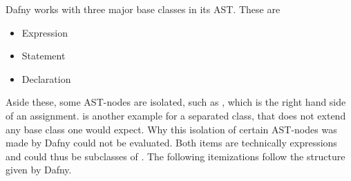 Dafny works with three major base classes in its AST.
These are
\begin{itemize}
    \item Expression
    \item Statement
    \item Declaration
\end{itemize}
Aside these, some AST-nodes are isolated, such as , which is the right hand side of an assignment.
 is another example for a separated class, that does not extend any base class one would expect.
Why this isolation of certain AST-nodes was made by Dafny could not be evaluated.
Both items are technically expressions and could thus be subclasses of .
The following itemizations follow the structure given by Dafny.

